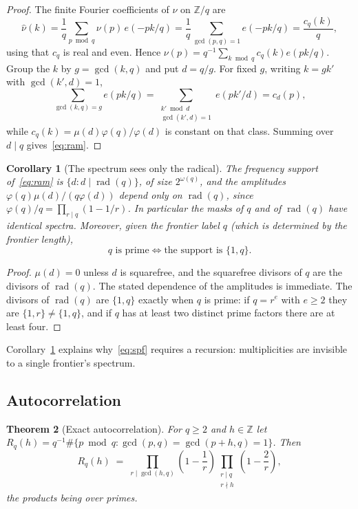\documentclass[11pt,a4paper]{article}
\theoremstyle{plain}
\newtheorem{theorem}{Theorem}[section]
\newtheorem{corollary}[theorem]{Corollary}
\theoremstyle{definition}
\theoremstyle{remark}
\DeclareMathOperator{\rad}{rad}
\newcommand{\Z}{\mathbb{Z}}
\newcommand{\e}[1]{e\!\left(#1\right)}
\begin{document}
\begin{proof}
The finite Fourier coefficients of $\nu$ on $\Z/q$ are
\[
  \widehat\nu(k) = \frac1q \sum_{p \bmod q} \nu(p)\, \e{-pk/q}
  = \frac1q \sum_{\gcd(p,q)=1} \e{-pk/q} = \frac{c_q(k)}{q},
\]
using that $c_q$ is real and even. Hence
$\nu(p) = q^{-1}\sum_{k \bmod q} c_q(k) \e{pk/q}$. Group the $k$ by
$g = \gcd(k,q)$ and put $d = q/g$. For fixed $g$, writing $k = g k'$ with
$\gcd(k', d) = 1$,
\[
  \sum_{\gcd(k,q) = g} \e{pk/q} = \sum_{\substack{k' \bmod d \\ \gcd(k',d)=1}} \e{pk'/d} = c_d(p),
\]
while $c_q(k) = \mu(d)\varphi(q)/\varphi(d)$ is constant on that class. Summing
over $d \mid q$ gives~\eqref{eq:ram}.
\end{proof}

\begin{corollary}[The spectrum sees only the radical]\label{cor:radical}
The frequency support of~\eqref{eq:ram} is
$\{ d : d \mid \rad(q) \}$, of size $2^{\omega(q)}$, and the amplitudes
$\varphi(q)\mu(d)/(q\varphi(d))$ depend only on $\rad(q)$, since
$\varphi(q)/q = \prod_{r \mid q}(1 - 1/r)$. In particular the masks of $q$ and
of $\rad(q)$ have identical spectra. Moreover, given the frontier label $q$
(which is determined by the frontier length),
\[
  q \text{ is prime} \iff \text{the support is } \{1, q\}.
\]
\end{corollary}

\begin{proof}
$\mu(d) = 0$ unless $d$ is squarefree, and the squarefree divisors of $q$ are
the divisors of $\rad(q)$. The stated dependence of the amplitudes is immediate.
The divisors of $\rad(q)$ are $\{1,q\}$ exactly when $q$ is prime: if $q = r^e$
with $e \ge 2$ they are $\{1,r\} \ne \{1,q\}$, and if $q$ has at least two
distinct prime factors there are at least four.
\end{proof}

Corollary~\ref{cor:radical} explains why~\eqref{eq:spf} requires a recursion:
multiplicities are invisible to a single frontier's spectrum.

\subsection{Autocorrelation}

\begin{theorem}[Exact autocorrelation]\label{thm:autocorr}
For $q \ge 2$ and $h \in \Z$ let
$R_q(h) = q^{-1} \#\{ p \bmod q : \gcd(p,q) = \gcd(p+h,q) = 1 \}$. Then
\begin{equation}\label{eq:autocorr}
  R_q(h) \;=\; \prod_{r \mid \gcd(h,q)} \left(1 - \frac1r\right)
               \prod_{\substack{r \mid q \\ r \nmid h}} \left(1 - \frac2r\right),
\end{equation}
the products being over primes.
\end{theorem}
\end{document}

